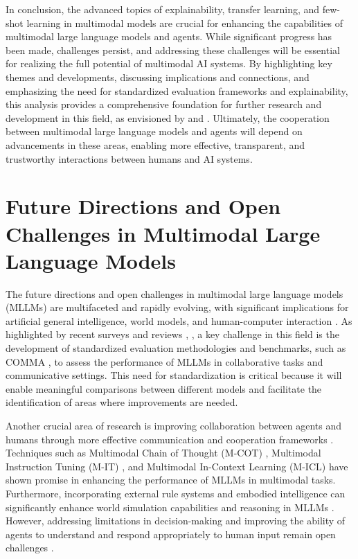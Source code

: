 \documentclass[conference]{IEEEtran}
\begin{document}
In conclusion, the advanced topics of explainability, transfer learning, and few-shot learning in multimodal models are crucial for enhancing the capabilities of multimodal large language models and agents. While significant progress has been made, challenges persist, and addressing these challenges will be essential for realizing the full potential of multimodal AI systems. By highlighting key themes and developments, discussing implications and connections, and emphasizing the need for standardized evaluation frameworks and explainability, this analysis provides a comprehensive foundation for further research and development in this field, as envisioned by \cite{b1} and \cite{b5}. Ultimately, the cooperation between multimodal large language models and agents will depend on advancements in these areas, enabling more effective, transparent, and trustworthy interactions between humans and AI systems.

\section{Future Directions and Open Challenges in Multimodal Large Language Models}
The future directions and open challenges in multimodal large language models (MLLMs) are multifaceted and rapidly evolving, with significant implications for artificial general intelligence, world models, and human-computer interaction \cite{b1}. As highlighted by recent surveys and reviews \cite{b2}, \cite{b3}, a key challenge in this field is the development of standardized evaluation methodologies and benchmarks, such as COMMA \cite{b4}, to assess the performance of MLLMs in collaborative tasks and communicative settings. This need for standardization is critical because it will enable meaningful comparisons between different models and facilitate the identification of areas where improvements are needed.

Another crucial area of research is improving collaboration between agents and humans through more effective communication and cooperation frameworks \cite{b5}. Techniques such as Multimodal Chain of Thought (M-COT) \cite{b6}, Multimodal Instruction Tuning (M-IT) \cite{b7}, and Multimodal In-Context Learning (M-ICL) \cite{b8} have shown promise in enhancing the performance of MLLMs in multimodal tasks. Furthermore, incorporating external rule systems and embodied intelligence can significantly enhance world simulation capabilities and reasoning in MLLMs \cite{b9}. However, addressing limitations in decision-making and improving the ability of agents to understand and respond appropriately to human input remain open challenges \cite{b10}.
\end{document}
